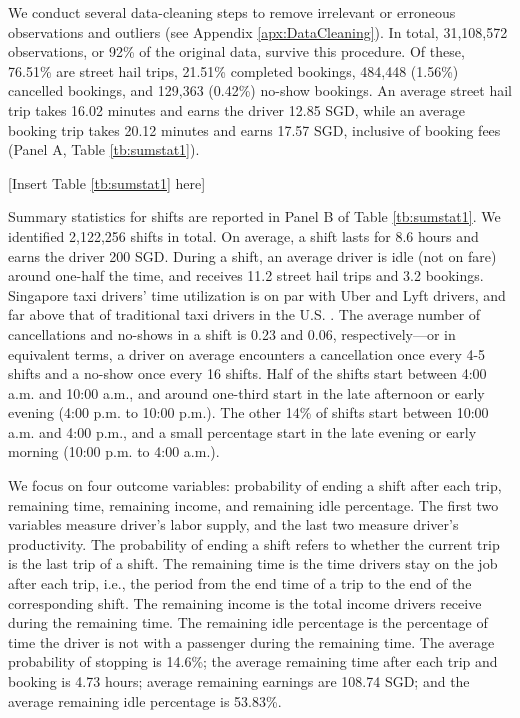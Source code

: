 \documentclass[reviewmode]{restat}
\begin{document}
We conduct several data-cleaning steps to remove irrelevant or erroneous observations and outliers (see Appendix \ref{apx:DataCleaning}).
In total, 31,108,572 observations, or 92\% of the original data, survive this procedure. Of these, 76.51\% are
street hail trips, 21.51\% completed bookings, 484,448 (1.56\%) cancelled bookings, and 129,363 (0.42\%) no-show
bookings. An average street hail trip takes 16.02 minutes and earns the driver 12.85 SGD, while an average  
booking trip takes 20.12 minutes and earns 17.57 SGD, inclusive of booking fees (Panel A, Table \ref{tb:sumstat1}).


\begin{center}
	[Insert Table \ref{tb:sumstat1} here]
\end{center}


Summary statistics for shifts are reported in Panel B of Table \ref{tb:sumstat1}. 
We identified 2,122,256 shifts in total. On average, a shift lasts for 8.6 hours and earns the driver 200 SGD. 
During a shift, an average driver is idle (not on fare) around one-half the time, and receives 11.2 street
hail trips and 3.2 bookings.  Singapore taxi drivers' time utilization is on par with Uber and Lyft drivers,
and far above that of traditional taxi drivers in the U.S. \citep{cramer2016disruptive}.
The average number of cancellations and no-shows in a shift is 0.23 and 0.06, respectively---or in equivalent terms,
a driver on average encounters a cancellation once every 4-5 shifts and a no-show once every 16 shifts.
Half of the shifts start between 4:00 a.m. and 10:00 a.m., and around one-third start in the late afternoon 
or early evening (4:00 p.m. to 10:00 p.m.). The other 14\% of shifts start between 10:00 a.m. and 4:00 p.m.,
and a small percentage start in the late evening or early morning (10:00 p.m. to 4:00 a.m.).


We focus on four outcome variables: probability of ending a shift after each trip, remaining time, 
remaining income, and remaining idle percentage. The first two variables measure driver's labor supply, 
and the last two measure driver's productivity. The probability of ending a shift refers to whether the 
current trip is the last trip of a shift. The remaining time is the time drivers stay on the job after
each trip, i.e., the period from the end time of a trip to the end of the corresponding shift. 
The remaining income is the total income drivers receive during the remaining time. 
The remaining idle percentage is the percentage of time the driver is not with a passenger during the remaining time.
The average probability of stopping is 14.6\%; the average remaining time after each trip and booking is 4.73 hours; 
average remaining earnings are 108.74 SGD; 
and the average remaining idle percentage is 53.83\%. 
\end{document}
